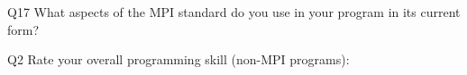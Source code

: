 \begin{description}%
\item{Q17} What aspects of the MPI standard do you use in your program in its current form?%
\item{Q2} Rate your overall programming skill (non-MPI programs):%
\end{description}%
